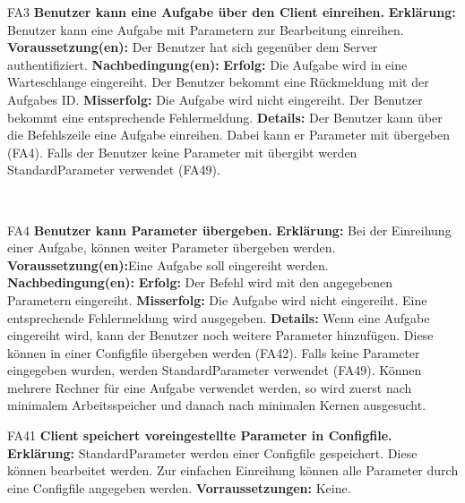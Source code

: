 \documentclass[a4paper,12pt]{article}
\begin{document}
\begin{itemize}[nosep]
    \begin{minipage}[t] {\linewidth}
    	\item[FA3] \textbf{Benutzer kann eine \gls{Aufgabe} über den \gls{Client} einreihen.}
    	\subitem \textbf{Erklärung:} \gls{Benutzer} kann eine \gls{Aufgabe} mit \gls{Parameter}n zur Bearbeitung einreihen.
    	\subitem \textbf{Voraussetzung(en):} Der \gls{Benutzer} hat sich gegenüber dem \gls{Server} authentifiziert.
    	\subitem \textbf{Nachbedingung(en):}
    	\subsubitem \textbf{Erfolg:} Die \gls{Aufgabe} wird in eine \gls{Warteschlange} eingereiht. Der \gls{Benutzer} bekommt eine Rückmeldung mit der \glspl{Aufgabe} ID.
    	\subsubitem \textbf{Misserfolg:} Die \gls{Aufgabe} wird nicht eingereiht. Der \gls{Benutzer} bekommt eine entsprechende Fehlermeldung.
    	\subitem \textbf{Details:} Der \gls{Benutzer} kann über die \gls{Befehlszeile} eine \gls{Aufgabe} einreihen. Dabei kann er \gls{Parameter} mit übergeben (FA4). Falls der \gls{Benutzer} keine \gls{Parameter} mit übergibt werden Standard\gls{Parameter} verwendet (FA49).
   \end{minipage}
   \newline
   \\
	
	\begin{minipage}[t]{\linewidth}
		\item[FA4] \textbf{Benutzer kann \gls{Parameter} übergeben.}
		\subitem \textbf{Erklärung:} Bei der Einreihung einer \gls{Aufgabe}, können weiter \gls{Parameter} übergeben werden.
		\subitem \textbf{Voraussetzung(en):}Eine \gls{Aufgabe} soll eingereiht werden.
		\subitem \textbf{Nachbedingung(en):}
		\subsubitem \textbf{Erfolg:} Der Befehl wird mit den angegebenen \gls{Parameter}n eingereiht.
		\subsubitem \textbf{Misserfolg:} Die \gls{Aufgabe} wird nicht eingereiht. Eine entsprechende Fehlermeldung wird ausgegeben.
		\subitem \textbf{Details:} Wenn eine \gls{Aufgabe} eingereiht wird, kann der \gls{Benutzer} noch weitere \gls{Parameter} hinzufügen. Diese können in einer \gls{Configfile} übergeben werden (FA42). Falls keine \gls{Parameter} eingegeben wurden, werden Standard\gls{Parameter} verwendet (FA49).
		Können mehrere Rechner für eine \gls{Aufgabe} verwendet werden, so wird zuerst nach minimalem Arbeitsspeicher und danach nach minimalen Kernen ausgesucht.
	\end{minipage}
	\pagebreak
	
	\begin{minipage}[t]{\linewidth}
		\item[FA41] \textbf{\gls{Client} speichert voreingestellte \gls{Parameter} in \gls{Configfile}.}
		\subitem \textbf{Erklärung:} Standard\gls{Parameter} werden einer \gls{Configfile} gespeichert.
		Diese können bearbeitet werden. Zur einfachen Einreihung können alle \gls{Parameter} durch eine \gls{Configfile} angegeben werden.
		\subitem \textbf{Vorraussetzungen:} Keine.
		

\end{minipage}
\end{itemize}
\end{document}
